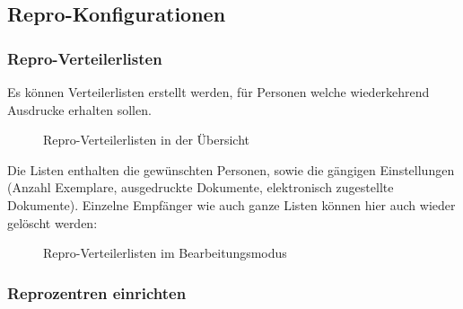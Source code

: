 \subsection{Repro-Konfigurationen}

\subsubsection{Repro-Verteilerlisten}

Es können Verteilerlisten erstellt werden, für Personen welche wiederkehrend Ausdrucke erhalten sollen.

\begin{figure}[H]
\caption{Repro-Verteilerlisten in der Übersicht}
\end{figure}

Die Listen enthalten die gewünschten Personen, sowie die gängigen Einstellungen (Anzahl Exemplare, ausgedruckte Dokumente, elektronisch zugestellte Dokumente). Einzelne Empfänger wie auch ganze Listen können hier auch wieder gelöscht werden:

\begin{figure}[H]
\caption{Repro-Verteilerlisten im Bearbeitungsmodus}
\end{figure}

\subsubsection{Reprozentren einrichten}
\label{bkm:Ref2018071601}

